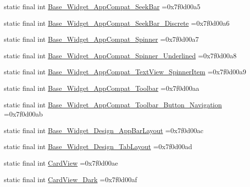 \begin{DoxyCompactItemize}
\item 
static final int \mbox{\hyperlink{classbr_1_1unb_1_1cic_1_1mp_1_1marketmaster_1_1R_1_1style_a74ac9a0a4e3225dd465a557fa1d2975c}{Base\+\_\+\+Widget\+\_\+\+App\+Compat\+\_\+\+Seek\+Bar}} =0x7f0d00a5
\item 
static final int \mbox{\hyperlink{classbr_1_1unb_1_1cic_1_1mp_1_1marketmaster_1_1R_1_1style_a45328aff83ce23edbe9ac36f2b40f785}{Base\+\_\+\+Widget\+\_\+\+App\+Compat\+\_\+\+Seek\+Bar\+\_\+\+Discrete}} =0x7f0d00a6
\item 
static final int \mbox{\hyperlink{classbr_1_1unb_1_1cic_1_1mp_1_1marketmaster_1_1R_1_1style_af2e7bb32bf6b822c6596d1f62ce00085}{Base\+\_\+\+Widget\+\_\+\+App\+Compat\+\_\+\+Spinner}} =0x7f0d00a7
\item 
static final int \mbox{\hyperlink{classbr_1_1unb_1_1cic_1_1mp_1_1marketmaster_1_1R_1_1style_a68322b8843ceb364da08e892c054eaa2}{Base\+\_\+\+Widget\+\_\+\+App\+Compat\+\_\+\+Spinner\+\_\+\+Underlined}} =0x7f0d00a8
\item 
static final int \mbox{\hyperlink{classbr_1_1unb_1_1cic_1_1mp_1_1marketmaster_1_1R_1_1style_a4aa1f5ca7ff268cb9925649a400c6924}{Base\+\_\+\+Widget\+\_\+\+App\+Compat\+\_\+\+Text\+View\+\_\+\+Spinner\+Item}} =0x7f0d00a9
\item 
static final int \mbox{\hyperlink{classbr_1_1unb_1_1cic_1_1mp_1_1marketmaster_1_1R_1_1style_a6c802c39f6c6216a2b0da2f08cdfd7e9}{Base\+\_\+\+Widget\+\_\+\+App\+Compat\+\_\+\+Toolbar}} =0x7f0d00aa
\item 
static final int \mbox{\hyperlink{classbr_1_1unb_1_1cic_1_1mp_1_1marketmaster_1_1R_1_1style_a846d0a4da4e8ccbca15e52faa5e097b6}{Base\+\_\+\+Widget\+\_\+\+App\+Compat\+\_\+\+Toolbar\+\_\+\+Button\+\_\+\+Navigation}} =0x7f0d00ab
\item 
static final int \mbox{\hyperlink{classbr_1_1unb_1_1cic_1_1mp_1_1marketmaster_1_1R_1_1style_acf68174106bb2bc83c3d18d9a6c94943}{Base\+\_\+\+Widget\+\_\+\+Design\+\_\+\+App\+Bar\+Layout}} =0x7f0d00ac
\item 
static final int \mbox{\hyperlink{classbr_1_1unb_1_1cic_1_1mp_1_1marketmaster_1_1R_1_1style_a2c65e679a631bed4f7d043576a85a878}{Base\+\_\+\+Widget\+\_\+\+Design\+\_\+\+Tab\+Layout}} =0x7f0d00ad
\item 
static final int \mbox{\hyperlink{classbr_1_1unb_1_1cic_1_1mp_1_1marketmaster_1_1R_1_1style_ad86352a1773828fb69d7e6a01a8c9f01}{Card\+View}} =0x7f0d00ae
\item 
static final int \mbox{\hyperlink{classbr_1_1unb_1_1cic_1_1mp_1_1marketmaster_1_1R_1_1style_a7cd911866440f3ffd3129b5f3dbaeb82}{Card\+View\+\_\+\+Dark}} =0x7f0d00af

\end{DoxyCompactItemize}
